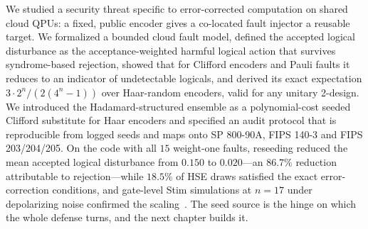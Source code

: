 We studied a security threat specific to error-corrected computation on shared cloud QPUs: a fixed, public encoder gives a co-located fault injector a reusable target. We formalized a bounded cloud fault model, defined the accepted logical disturbance as the acceptance-weighted harmful logical action that survives syndrome-based rejection, showed that for Clifford encoders and Pauli faults it reduces to an indicator of undetectable logicals, and derived its exact expectation $3\cdot 2^{n}/(2(4^{n}-1))$ over Haar-random encoders, valid for any unitary 2-design. We introduced the Hadamard-structured ensemble as a polynomial-cost seeded Clifford substitute for Haar encoders and specified an audit protocol that is reproducible from logged seeds and maps onto SP 800-90A, FIPS 140-3 and FIPS 203/204/205. On the  code with all $15$ weight-one faults, reseeding reduced the mean accepted logical disturbance from $0.150$ to $0.020$---an $86.7\%$ reduction attributable to rejection---while $18.5\%$ of HSE draws satisfied the exact error-correction conditions, and gate-level Stim simulations at $n=17$ under depolarizing noise confirmed the scaling~\cite{guo2026qecaudit}. The seed source is the hinge on which the whole defense turns, and the next chapter builds it.

